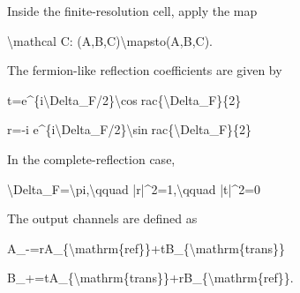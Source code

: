 \documentclass[
  a4paper,
]{article}
\newenvironment{Shaded}{}{}
\newcommand{\NormalTok}[1]{#1}
\begin{document}
Inside the finite-resolution cell, apply the map

\begin{Shaded}
\begin{Highlighting}[]
\NormalTok{\textbackslash{}mathcal C:}
\NormalTok{(A\textquotesingle{},B\textquotesingle{},C\textquotesingle{})\textbackslash{}mapsto(A\textquotesingle{}\textquotesingle{},B\textquotesingle{}\textquotesingle{},C\textquotesingle{}\textquotesingle{}).}
\end{Highlighting}
\end{Shaded}

The fermion-like reflection coefficients are given by

\begin{Shaded}
\begin{Highlighting}[]
\NormalTok{t=e\^{}\{i\textbackslash{}Delta\_F/2\}\textbackslash{}cosrac\{\textbackslash{}Delta\_F\}\{2\}}
\end{Highlighting}
\end{Shaded}

\begin{Shaded}
\begin{Highlighting}[]
\NormalTok{r={-}i e\^{}\{i\textbackslash{}Delta\_F/2\}\textbackslash{}sinrac\{\textbackslash{}Delta\_F\}\{2\}}
\end{Highlighting}
\end{Shaded}

In the complete-reflection case,

\begin{Shaded}
\begin{Highlighting}[]
\NormalTok{\textbackslash{}Delta\_F=\textbackslash{}pi,\textbackslash{}qquad |r|\^{}2=1,\textbackslash{}qquad |t|\^{}2=0}
\end{Highlighting}
\end{Shaded}

The output channels are defined as

\begin{Shaded}
\begin{Highlighting}[]
\NormalTok{A\_{-}\textquotesingle{}\textquotesingle{}=rA\_\{\textbackslash{}mathrm\{ref\}\}\textquotesingle{}+tB\_\{\textbackslash{}mathrm\{trans\}\}\textquotesingle{}}
\end{Highlighting}
\end{Shaded}

\begin{Shaded}
\begin{Highlighting}[]
\NormalTok{B\_+\textquotesingle{}\textquotesingle{}=tA\_\{\textbackslash{}mathrm\{trans\}\}\textquotesingle{}+rB\_\{\textbackslash{}mathrm\{ref\}\}\textquotesingle{}.}
\end{Highlighting}
\end{Shaded}
\end{document}

